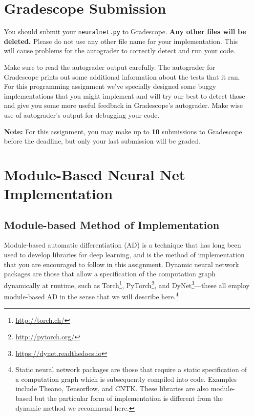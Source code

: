 \documentclass[11pt,addpoints,answers]{exam}
\begin{document}
\section{Gradescope Submission}
You should submit your \texttt{neuralnet.py} to Gradescope. \textbf{Any other files will be deleted.} Please do not use any other file name for your implementation. This will cause problems for the autograder to correctly detect and run your code.

Make sure to read the autograder output carefully. The autograder for Gradescope prints out some additional information about the tests that it ran. For this programming assignment we've specially designed some buggy implementations that you might implement and will try our best to detect those and give you some more useful feedback in Gradescope's autograder. Make wise use of autograder's output for debugging your code.

\textbf{Note:} For this assignment, you may make up to \textbf{10} submissions to Gradescope before the deadline, but only your last submission will be graded.

\newpage

\section{Module-Based Neural Net Implementation}

\subsection{Module-based Method of Implementation}
\label{sec:modulebased}

Module-based automatic differentiation (AD) is a technique that has long been used to develop libraries for deep learning, and is the method of implementation that you are encouraged to follow in this assignment. Dynamic neural network packages are those that allow a specification of the computation graph dynamically at runtime, such as Torch\footnote{\url{http://torch.ch/}}, PyTorch\footnote{\url{http://pytorch.org/}}, and DyNet\footnote{\url{https://dynet.readthedocs.io}}---these all employ module-based AD in the sense that we will describe here.\footnote{Static neural network packages are those that require a static specification of a computation graph which is subsequently compiled into code. Examples include Theano, Tensorflow, and CNTK. These libraries are also module-based but the particular form of implementation is different from the dynamic method we recommend here.}
\end{document}
